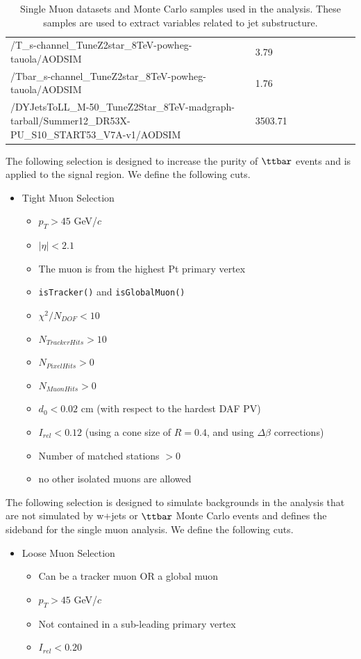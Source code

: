 \begin{table}
\begin{center}
\begin{tabular}{|p{0.7\linewidth}|p{0.3\linewidth}|}
/T\_s-channel\_TuneZ2star\_8TeV-powheg-tauola/AODSIM & 3.79\\
/Tbar\_s-channel\_TuneZ2star\_8TeV-powheg-tauola/AODSIM & 1.76\\
/DYJetsToLL\_M-50\_TuneZ2Star\_8TeV-madgraph-tarball/Summer12\_DR53X-PU\_S10\_START53\_V7A-v1/AODSIM & 3503.71\\
\hline
\end{tabular}
\end{center}
\caption{Single Muon datasets and Monte Carlo samples used in the analysis.  These samples are used to extract variables related to jet substructure.}
\label{table:singlemusets}
\end{table}

The following selection is designed to increase the purity of $\ttbar$ events and is applied to the signal region.  We define the following cuts. 
\begin{itemize}
\item Tight Muon Selection
\begin{itemize}
\item $p_T > 45$ GeV/$c$
\item $|\eta| < 2.1$
\item The muon is from the highest Pt primary vertex
\item \verb!isTracker()! and \verb!isGlobalMuon()!
\item $\chi^2 / N_{DOF} < 10$
\item $N_{Tracker Hits} > 10$
\item $N_{Pixel Hits} > 0$
\item $N_{Muon Hits} > 0$
\item $d_0 < 0.02$ cm (with respect to the hardest DAF PV)
\item $I_{rel} < 0.12$ (using a cone size of $R=0.4$, and using $\Delta\beta$ corrections)
\item Number of matched stations $> 0$
\item no other isolated muons are allowed
\end{itemize}
\end{itemize}

The following selection is designed to simulate backgrounds in the analysis that are not simulated by 
w+jets or $\ttbar$ Monte Carlo  events and defines the sideband for the single muon analysis.  We define the following cuts.
\begin{itemize} 
\item Loose Muon Selection
\begin{itemize}
\item Can be a tracker muon OR a global muon
\item $p_T > 45$ GeV/$c$
\item Not contained in a sub-leading primary vertex
\item $I_{rel} < 0.20$
\end{itemize}
\end{itemize}


